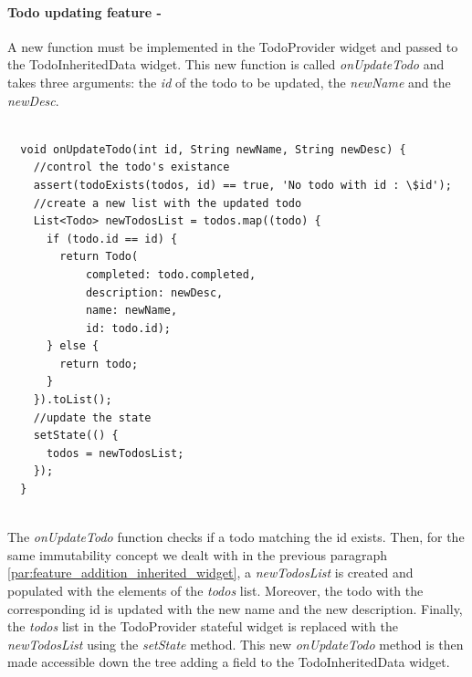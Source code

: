 \paragraph{Todo updating feature - } 
\label{subpar:todo_updating_feature_inherited_wdiget}
A new function must be implemented in the TodoProvider widget and passed to the TodoInheritedData widget. This new function is called \textit{onUpdateTodo } and takes three arguments: the \textit{id} of the todo to be updated, the \textit{newName } and the \textit{newDesc}.
\mbox{}\\
\begin{code}
\mbox{}
\label{code:2.37} 
\begin{verbatim}

  void onUpdateTodo(int id, String newName, String newDesc) {
    //control the todo's existance
    assert(todoExists(todos, id) == true, 'No todo with id : \$id');
    //create a new list with the updated todo
    List<Todo> newTodosList = todos.map((todo) {
      if (todo.id == id) {
        return Todo(
            completed: todo.completed,
            description: newDesc,
            name: newName,
            id: todo.id);
      } else {
        return todo;
      }
    }).toList();
    //update the state
    setState(() {
      todos = newTodosList;
    });
  }

\end{verbatim}
\end{code}
\mbox{}\\
The \textit{onUpdateTodo} function checks if a todo matching the id exists. Then, for the same immutability concept we dealt with in the previous paragraph \ref{par:feature_addition_inherited_widget}, a \textit{newTodosList }is created and populated with the elements of the \textit{todos }list. Moreover, the todo with the corresponding id is updated with the new name and the new description. Finally, the \textit{todos }list in the TodoProvider stateful widget is replaced with the \textit{newTodosList }using the \textit{setState} method.
This new \textit{onUpdateTodo} method is then made accessible down the tree adding a field to the TodoInheritedData widget.
\mbox{}\\
